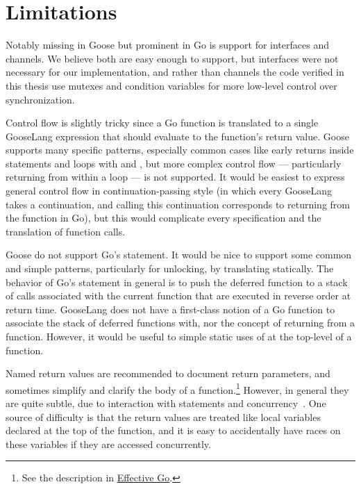 \section{Limitations}%
\label{sec:goose:limitations}

Notably missing in Goose but prominent in Go is support for interfaces
and channels. We believe both are easy enough to support, but interfaces
were not necessary for our implementation, and rather than channels the code
verified in this thesis
use mutexes and condition variables for more low-level control over
synchronization.

Control flow is slightly tricky since a Go function is translated
to a single GooseLang expression that should evaluate to the function's
return value. Goose supports many specific patterns, especially common
cases like early returns inside  statements and loops with
 and , but more complex control flow ---
particularly returning from within a loop --- is not supported. It would be
easiest to express general control flow in continuation-passing style (in which
every GooseLang takes a continuation, and calling this continuation corresponds
to returning from the function in Go), but this
would complicate every specification and the translation of function calls.

Goose do not support Go's  statement. It would be nice to support some
common and simple patterns, particularly for unlocking, by translating
 statically. The behavior of Go's  statement in general is
to push the deferred function to a stack of calls associated with the current function that are executed in reverse order at return
time. GooseLang does not have a first-class notion of a Go function to associate
the stack of deferred functions with, nor the concept of returning
from a function. However, it would be useful to simple static uses of 
at the top-level of a function.

Named return values are recommended to document return parameters, and sometimes
simplify and clarify the body of a function.\footnote{See the description in
\href{https://go.dev/doc/effective_go\#named-results}{Effective Go}.} However, in
general they are quite subtle, due to interaction with  statements and
concurrency~\cite{chabbi:golang-races}. One source of difficulty is that the
return values are treated like local variables declared at the top of the
function, and it is easy to accidentally have races on these variables if they
are accessed concurrently.

